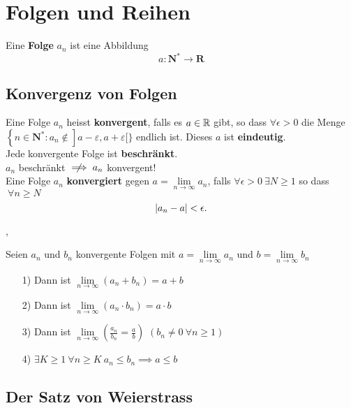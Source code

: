\section{Folgen und Reihen}

\Def[2.1.1] Eine \textbf{Folge} $a_n$ ist eine Abbildung
\[
a: \mathbf{N}^{*} \longrightarrow \mathbf{R}
\] 
\subsection{Konvergenz von Folgen}

\Def[2.1.4] Eine Folge $a_n$ heisst \textbf{konvergent}, falls es $a \in \mathbb{R}$ gibt, so dass $\forall \epsilon > 0$ die Menge
$
\left\{n \in \mathbf{N}^{*}: a_{n} \notin\right] a-\varepsilon, a+\varepsilon[\}
$ endlich ist.
\Lemma[2.1.3] Dieses $a$ ist \textbf{eindeutig}. \\

\Lemma[2.1.5] Jede konvergente Folge ist \textbf{beschränkt}. \\
\Achtung $a_{n}$ beschränkt $\centernot\implies a_{n}$ konvergent! \\

\Lemma[2.1.6] Eine Folge $a_n$ \textbf{konvergiert} gegen ${a = \lim\limits_{n \rightarrow \infty} a_{n}}$, falls $ \forall \epsilon > 0 \ \exists N \geq 1$ so dass $\ \forall n\geq N$
\[
 \left\lvert a_n-a \right\rvert < \epsilon.
\]

\sep

\Satz[2.1.8] Seien $a_n$ und $b_n$ konvergente Folgen mit $a = \lim\limits_{n \rightarrow \infty} a_{n}$ und  $b = \lim\limits_{n \rightarrow \infty} b_{n}$
\begin{enumerate}
\item[1)] Dann ist $\lim\limits_{n \rightarrow \infty} (a_{n} + b_{n}) = a + b$
\item[2)] Dann ist $\lim\limits_{n \rightarrow \infty} (a_{n} \cdot b_{n}) = a \cdot b$
\item[3)] Dann ist $\lim\limits_{n \rightarrow \infty} (\frac{a_{n}}{b_{n}} = \frac{a}{b})$ $(b_{n} \neq 0 \ \forall n \geq 1)$
\item[4)] $\exists K \geq 1 \ \forall n \geq K \ a_{n} \leq b_{n} \implies a \leq b$

\end{enumerate}

\subsection{Der Satz von Weierstrass}

